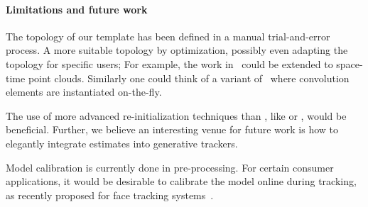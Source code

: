 \paragraph{Limitations and future work} 
The topology of our template has been defined in a manual trial-and-error process. A more suitable topology  by optimization, possibly even adapting the topology for specific users; For example, the work in~\cite{thiery2016spheremesh} could be extended to space-time point clouds. Similarly one could think of a variant of~\cite{newcombe2015dynfusion} where convolution elements are instantiated on-the-fly.
% 
\begin{draft}
The use of more advanced re-initialization techniques than \cite{qian2014realtime}, like \cite{krupka2014discriminative} or \cite{oberweger2015feedback}, would be beneficial. Further, we believe an interesting venue for future work is how to elegantly integrate  estimates into generative trackers.
\end{draft}
% 
Model calibration is currently done in pre-processing. For certain consumer applications, it would be desirable to calibrate the model online during tracking, as recently proposed for face tracking systems~\cite{bouaziz2013online}. 
% 



